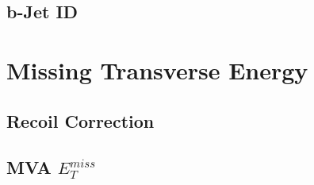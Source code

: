 
\subsection{b-Jet ID}
\section{Missing Transverse Energy}

\subsection{Recoil Correction}
\subsection{MVA $E_{T}^{miss}$}
